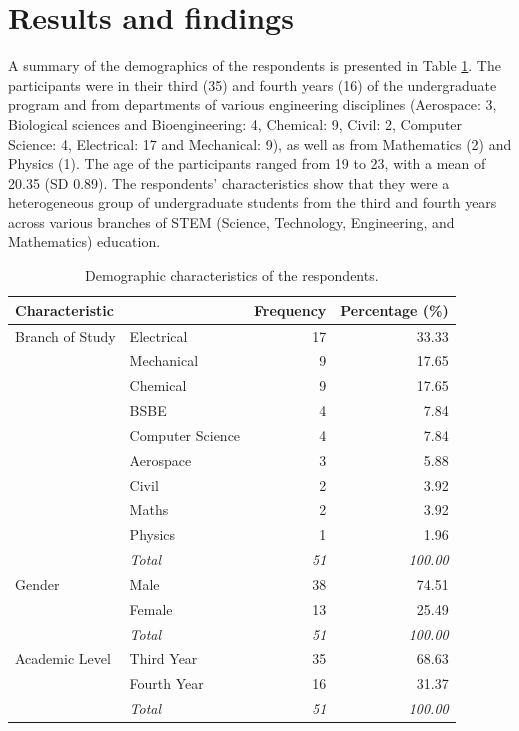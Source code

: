 \documentclass[english]{textolivre}
\begin{document}
\section{Results and findings}
A summary of the demographics of the respondents is presented in Table \ref{tab-1}. The participants were in their third (35) and fourth years (16) of the undergraduate program and from departments of various engineering disciplines (Aerospace: 3, Biological sciences and Bioengineering: 4, Chemical: 9, Civil: 2, Computer Science: 4, Electrical: 17 and Mechanical: 9), as well as from Mathematics (2) and Physics (1). The age of the participants ranged from 19 to 23, with a mean of 20.35 (SD 0.89). The respondents’ characteristics show that they were a heterogeneous group of undergraduate students from the third and fourth years across various branches of STEM (Science, Technology, Engineering, and Mathematics) education.

\begin{table}[h!]
\centering
\begin{threeparttable}
\caption{Demographic characteristics of the respondents.}\label{tab-1}
\begin{tabular}{llrr}
\toprule 
Characteristic & & Frequency & Percentage (\%) \\
\midrule
Branch of Study & Electrical & 17 & 33.33 \\
                & Mechanical & 9 & 17.65 \\
                & Chemical & 9 & 17.65 \\
                & BSBE & 4 & 7.84 \\
                & Computer Science & 4 & 7.84 \\
                & Aerospace & 3 & 5.88 \\
                & Civil & 2 & 3.92 \\
                & Maths & 2 & 3.92 \\
                & Physics & 1 & 1.96 \\
        &\emph{Total} & \emph{51} & \emph{100.00} \\
Gender          & Male & 38 & 74.51 \\
                & Female & 13 & 25.49 \\
        &\emph{Total} & \emph{51} & \emph{100.00} \\
Academic Level  & Third Year & 35 & 68.63 \\
                & Fourth Year & 16 & 31.37 \\
        &\emph{Total} & \emph{51} & \emph{100.00} \\
\bottomrule
\end{tabular}
\end{threeparttable}
\end{table}
\end{document}
